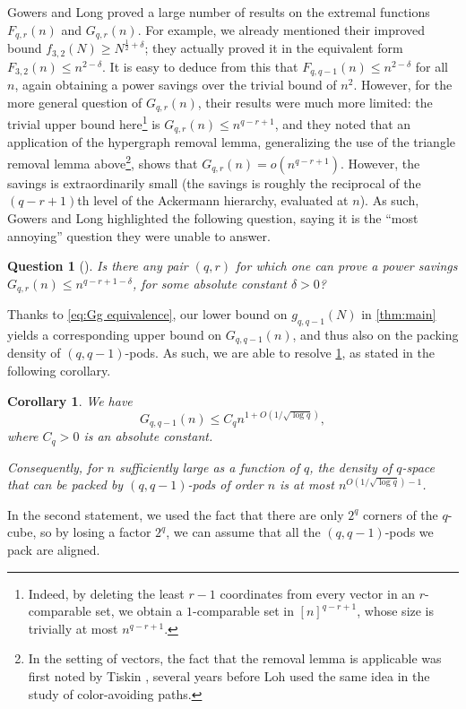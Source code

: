 \documentclass[11pt,reqno]{amsart}
\newtheorem{corollary}[theorem]{Corollary}
\newtheorem{question}[theorem]{Question}
\theoremstyle{definition}
\newcommand\1{\mathbf{1}}
\let\leq\leqslant
\let\geq\geqslant
\begin{document}
Gowers and Long \cite{MR4298506} proved a large number of results on the extremal functions $F_{q,r}(n)$ and $G_{q,r}(n)$. For example, we already mentioned their improved bound $f_{3,2}(N) \geq N^{\frac 12 + \delta}$; they actually proved it in the equivalent form $F_{3,2}(n) \leq n^{2-\delta}$. It is easy to deduce from this that $F_{q,q-1}(n) \leq n^{2-\delta}$ for all $n$, again obtaining a power savings over the trivial bound of $n^2$. However, for the more general question of $G_{q,r}(n)$, their results were much more limited: the trivial upper bound here\footnote{Indeed, by deleting the least $r-1$ coordinates from every vector in an $r$-comparable set, we obtain a $1$-comparable set in $[n]^{q-r+1}$, whose size is trivially at most $n^{q-r+1}$.} is $G_{q,r}(n) \leq n^{q-r+1}$, and they noted that an application of the hypergraph removal lemma, generalizing the use of the triangle removal lemma above\footnote{In the setting of vectors, the fact that the removal lemma is applicable was first noted by Tiskin \cite{MR2326159}, several years before Loh \cite{1505.07312} used the same idea in the study of color-avoiding paths.}, shows that $G_{q,r}(n) = o(n^{q-r+1})$. However,
the savings is extraordinarily small (the savings is roughly the reciprocal of the $(q-r+1)$th level of the Ackermann hierarchy, evaluated at $n$). As such, Gowers and Long highlighted the following question, saying it is the ``most annoying'' question they were unable to answer. 
\begin{question}[{\cite[Question 6.3]{MR4298506}}]\label{qu:annoying}
Is there any pair $(q,r)$ for which one can prove a power savings $G_{q,r}(n) \leq n^{q-r+1-\delta}$, for some absolute constant $\delta>0$?
\end{question}
Thanks to \eqref{eq:Gg equivalence}, our lower bound on $g_{q,q-1}(N)$ in \cref{thm:main} yields a corresponding upper bound on $G_{q,q-1}(n)$, and thus also on the packing density of $(q,q-1)$-pods. As such, we are able to resolve \cref{qu:annoying}, as stated in the following corollary.
\begin{corollary}\label{cor:applications}
    We have
    \[
        G_{q,q-1}(n) \leq C_q n^{1+O(1/\sqrt{\log q})},
    \]
    where $C_q>0$ is an absolute constant. 

    Consequently, for $n$ sufficiently large as a function of $q$, the density of $q$-space that can be packed by $(q,q-1)$-pods of order $n$ is at most $n^{O(1/\sqrt{\log q})-1}$. 
\end{corollary}
In the second statement, we used the fact that there are only $2^q$ corners of the $q$-cube, so by losing a factor $2^q$, we can assume that all the $(q,q-1)$-pods we pack are aligned. 
\end{document}
